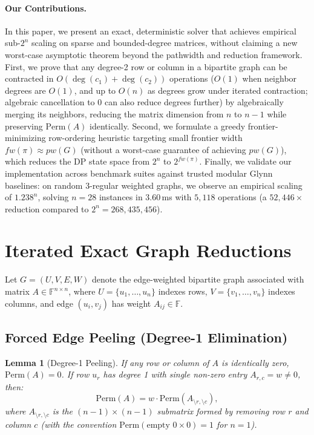 \documentclass[11pt,a4paper]{article}
\newtheorem{lemma}[theorem]{Lemma}
\theoremstyle{definition}
\newcommand{\Perm}{\mathrm{Perm}}
\newcommand{\F}{\mathbb{F}}
\begin{document}
\paragraph{Our Contributions.}
In this paper, we present an exact, deterministic solver that achieves empirical sub-$2^n$ scaling on sparse and bounded-degree matrices, without claiming a new worst-case asymptotic theorem beyond the pathwidth and reduction framework. First, we prove that any degree-2 row or column in a bipartite graph can be contracted in $O(\deg(c_1)+\deg(c_2))$ operations ($O(1)$ when neighbor degrees are $O(1)$, and up to $O(n)$ as degrees grow under iterated contraction; algebraic cancellation to $0$ can also reduce degrees further) by algebraically merging its neighbors, reducing the matrix dimension from $n$ to $n-1$ while preserving $\Perm(A)$ identically. Second, we formulate a greedy frontier-minimizing row-ordering heuristic targeting small frontier width $fw(\pi) \approx pw(G)$ (without a worst-case guarantee of achieving $pw(G)$), which reduces the DP state space from $2^n$ to $2^{fw(\pi)}$. Finally, we validate our implementation across benchmark suites against trusted modular Glynn baselines: on random 3-regular weighted graphs, we observe an empirical scaling of $1.238^n$, solving $n = 28$ instances in $3.60$\,ms with $5{,}118$ operations (a $52{,}446\times$ reduction compared to $2^n = 268{,}435{,}456$).

\section{Iterated Exact Graph Reductions}

Let $G = (U, V, E, W)$ denote the edge-weighted bipartite graph associated with matrix $A \in \F^{n \times n}$, where $U = \{u_1, \dots, u_n\}$ indexes rows, $V = \{v_1, \dots, v_n\}$ indexes columns, and edge $(u_i, v_j)$ has weight $A_{ij} \in \F$.

\subsection{Forced Edge Peeling (Degree-1 Elimination)}

\begin{lemma}[Degree-1 Peeling]
If any row or column of $A$ is identically zero, $\Perm(A) = 0$. If row $u_r$ has degree 1 with single non-zero entry $A_{r, c} = w \neq 0$, then:
\begin{equation}
\Perm(A) = w \cdot \Perm(A_{\setminus r, \setminus c}),
\end{equation}
where $A_{\setminus r, \setminus c}$ is the $(n-1) \times (n-1)$ submatrix formed by removing row $r$ and column $c$ (with the convention $\Perm(\text{empty } 0\times 0) = 1$ for $n = 1$).
\end{lemma}
\end{document}
